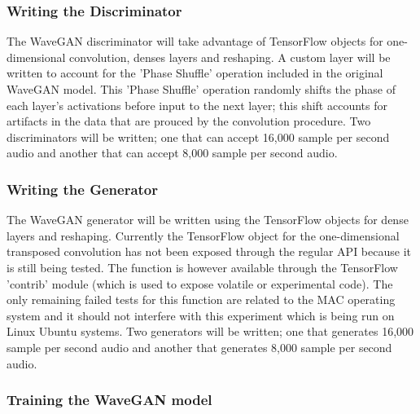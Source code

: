 \documentclass[a4paper, dvipsnames, titlepage]{article}
\begin{document}
\subsubsection{Writing the Discriminator}

The WaveGAN discriminator will take advantage of TensorFlow objects for one-dimensional convolution, denses layers and reshaping.
A custom layer will be written to account for the 'Phase Shuffle' operation included in the original WaveGAN model.
This 'Phase Shuffle' operation randomly shifts the phase of each layer's activations before input to the next layer; this shift accounts for artifacts in the data that are prouced by the convolution procedure.
Two discriminators will be written; one that can accept 16,000 sample per second audio and another that can accept 8,000 sample per second audio.

\subsubsection{Writing the Generator}

The WaveGAN generator will be written using the TensorFlow objects for dense layers and reshaping.
Currently the TensorFlow object for the one-dimensional transposed convolution has not been exposed through the regular API because it is still being tested.
The function is however available through the TensorFlow 'contrib' module (which is used to expose volatile or experimental code).
The only remaining failed tests for this function are related to the MAC operating system and it should not interfere with this experiment which is being run on Linux Ubuntu systems.
Two generators will be written; one that generates 16,000 sample per second audio and another that generates 8,000 sample per second audio.

\subsubsection{Training the WaveGAN model}
\end{document}
